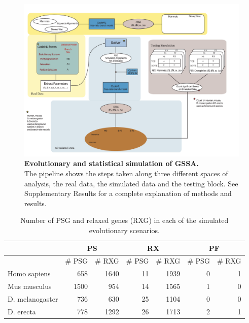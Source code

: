 \begin{figure}
\centering 
\includegraphics[width=\textwidth]{tex_source/figures/gssa/gssa_simulations_pipeline.pdf}
\caption[Evolutionary and statistical simulation of GSSA.]{{\bf Evolutionary and statistical simulation of GSSA.} \\ The pipeline shows the steps taken along three different spaces of analysis, the real data, the simulated data and the testing block. See Supplementary Results for a complete explanation of methods and results.}
\label{fig:gssa_simul_pipe}
\end{figure}

\begin{table}[htbp]
\begin{tabular}{l r r r r r r}
\multicolumn{1}{l}{} & \multicolumn{ 2}{c}{PS} & \multicolumn{ 2}{c}{RX} & \multicolumn{ 2}{c}{PF} \\ \hline
\multicolumn{1}{l}{} & \multicolumn{1}{c}{\# PSG} & \multicolumn{1}{c}{\# RXG} & \multicolumn{1}{c}{\# PSG} & \multicolumn{1}{c}{\# RXG} & \multicolumn{1}{c}{\# PSG} & \multicolumn{1}{c}{\# RXG} \\ \hline
Homo sapiens & 658 & 1640 & 11 & 1939 & 0 & 1 \\
Mus musculus & 1500 & 954 & 14 & 1565 & 1 & 0 \\
D. melanogaster & 736 & 630 & 25 & 1104 & 0 & 0 \\
D. erecta & 778 & 1292 & 26 & 1713 & 2 & 1 \\ \hline
\end{tabular}
\caption[Number of PSG and relaxed genes (RXG) in each of the simulated evolutionary scenarios]{Number of PSG and relaxed genes (RXG) in each of the simulated evolutionary scenarios.}
\label{tab:psg_simul}
\end{table}

